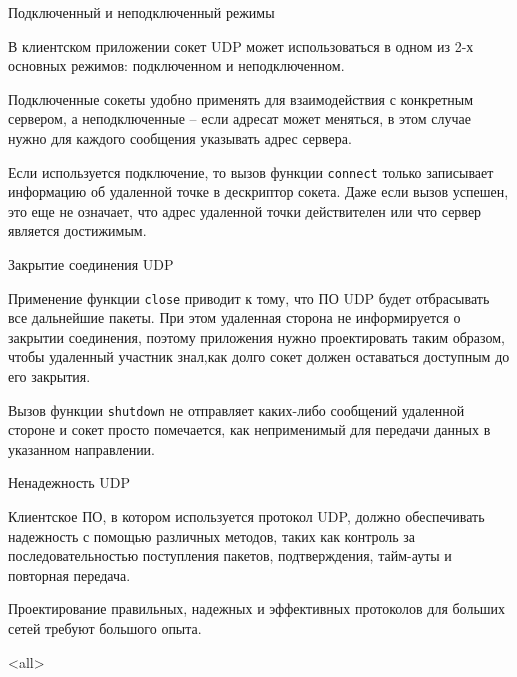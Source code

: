 \begin{frame}{Подключенный и неподключенный режимы}

В клиентском приложении сокет UDP может использоваться в одном из 2-х основных режимов: 
подключенном и неподключенном. 

Подключенные сокеты удобно применять для взаимодействия с конкретным сервером,
а неподключенные – если адресат может меняться,  в этом случае нужно для каждого сообщения указывать адрес сервера.

Если используется подключение,  то вызов функции {\tt connect} только записывает информацию 
об удаленной точке в дескриптор сокета. Даже если вызов успешен,  это еще не означает,  что адрес удаленной точки действителен или что сервер является достижимым.
\end{frame}

\begin{frame}{Закрытие соединения UDP}

	Применение функции {\tt close} приводит к тому,  что ПО UDP будет отбрасывать все дальнейшие пакеты.
	При этом удаленная сторона не информируется о закрытии соединения,  поэтому приложения нужно 
проектировать таким образом,  чтобы удаленный участник знал,как долго сокет 
должен оставаться доступным до его закрытия.

Вызов функции {\tt shutdown} не отправляет каких-либо сообщений удаленной стороне и сокет просто помечается,  как неприменимый для передачи данных в указанном направлении.
\end{frame}

\begin{frame}{Ненадежность UDP}

	Клиентское ПО,  в котором используется протокол UDP,  должно обеспечивать надежность с помощью различных методов,  таких как контроль за последовательностью поступления пакетов,  подтверждения,  тайм-ауты и повторная передача.
	
	Проектирование правильных,  надежных и эффективных протоколов для больших сетей требуют большого опыта.
\end{frame}

\mode<all>{}


